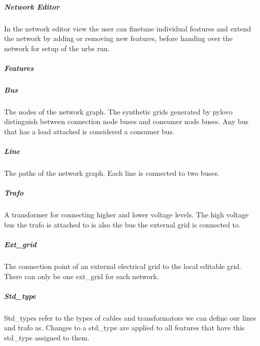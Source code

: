 \documentclass[letterpaper,10pt,english]{sphinxmanual}
\begin{document}
\subparagraph{Network Editor}
\label{\detokenize{docs_gui/usage/network_editor:network-editor}}\label{\detokenize{docs_gui/usage/network_editor::doc}}
\sphinxAtStartPar
In the network editor view the user can fine\sphinxhyphen{}tune individual features and extend the network by adding or removing new features, before handing over the network for
setup of the urbs run.


\subparagraph{Features}
\label{\detokenize{docs_gui/usage/network_editor:features}}

\subparagraph{Bus}
\label{\detokenize{docs_gui/usage/network_editor:bus}}
\begin{DUlineblock}{0em}
\item[] The nodes of the network graph. The synthetic grids generated by pylovo distinguish between connection node buses and consumer node buses.
Any bus that has a load attached is considered a consumer bus.
\end{DUlineblock}


\subparagraph{Line}
\label{\detokenize{docs_gui/usage/network_editor:line}}
\begin{DUlineblock}{0em}
\item[] The paths of the network graph. Each line is connected to two buses.
\end{DUlineblock}


\subparagraph{Trafo}
\label{\detokenize{docs_gui/usage/network_editor:trafo}}
\begin{DUlineblock}{0em}
\item[] A transformer for connecting higher and lower voltage levels. The high voltage bus the trafo is attached to is also the bus the external grid is connected to.
\end{DUlineblock}


\subparagraph{Ext\_grid}
\label{\detokenize{docs_gui/usage/network_editor:ext-grid}}
\begin{DUlineblock}{0em}
\item[] The connection point of an external electrical grid to the local editable grid. There can only be one ext\_grid for each network.
\end{DUlineblock}


\subparagraph{Std\_type}
\label{\detokenize{docs_gui/usage/network_editor:std-type}}
\begin{DUlineblock}{0em}
\item[] Std\_types refer to the types of cables and transformators we can define our lines and trafo as. Changes to a std\_type are applied to all features
that have this std\_type assigned to them.
\end{DUlineblock}
\end{document}
